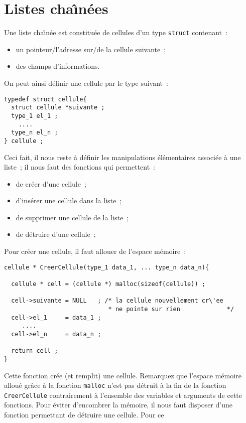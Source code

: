\section{Listes cha\^\i{}n\'ees}
\label{sec:ListesChaines}
Une  liste  cha\^\i{}n\'ee est   constitu\'ee de cellules d'un type
\texttt{struct} contenant~:
\begin{itemize}
\item un pointeur/l'adresse sur/de la cellule suivante~;
\item des champs d'informations.
\end{itemize}
On peut ainsi d\'efinir une cellule par le type suivant~:
\begin{verbatim}
typedef struct cellule{
  struct cellule *suivante ;
  type_1 el_1 ;
    .... 
  type_n el_n ;
} cellule ;
\end{verbatim}
Ceci fait,   il     nous  reste  \`a   d\'efinir    les  manipulations
\'el\'ementaires associ\'ee \`a une liste~; il nous faut des fonctions 
qui permettent~:
\begin{itemize}
\item de cr\'eer d'une cellule~;
\item d'ins\'erer une cellule dans la liste~;
\item de supprimer une cellule de la liste~;
\item de d\'etruire d'une cellule~;
\end{itemize}
Pour cr\'eer une cellule, il faut allouer de l'espace m\'emoire~:
\begin{verbatim}
cellule * CreerCellule(type_1 data_1, ... type_n data_n){

  cellule * cell = (cellule *) malloc(sizeof(cellule)) ;

  cell->suivante = NULL   ; /* la cellule nouvellement cr\'ee
                             * ne pointe sur rien             */
  cell->el_1     = data_1 ;
     ....
  cell->el_n     = data_n ;

  return cell ;
}
\end{verbatim}
Cette fonction cr\'ee (et remplit) une cellule. Remarquez que l'espace
m\'emoire allou\'e gr\^ace  \`a la fonction  \texttt{malloc} n'est pas
d\'etruit    \`a   la   fin de    la   fonction  \texttt{CreerCellule}
contrairement  \`a l'ensemble  des   variables et  arguments de  cette
fonctions.  Pour  \'eviter d'encombrer  la   m\'emoire, il nous   faut
disposer d'une fonction permettant de  d\'etruire une cellule. Pour ce
